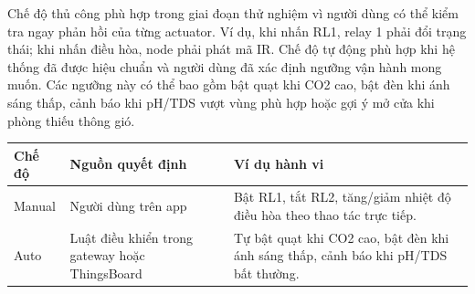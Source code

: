 Chế độ thủ công phù hợp trong giai đoạn thử nghiệm vì người dùng có thể kiểm tra ngay phản hồi của từng actuator. Ví dụ, khi nhấn RL1, relay 1 phải đổi trạng thái; khi nhấn điều hòa, node phải phát mã IR. Chế độ tự động phù hợp khi hệ thống đã được hiệu chuẩn và người dùng đã xác định ngưỡng vận hành mong muốn. Các ngưỡng này có thể bao gồm bật quạt khi CO2 cao, bật đèn khi ánh sáng thấp, cảnh báo khi pH/TDS vượt vùng phù hợp hoặc gợi ý mở cửa khi phòng thiếu thông gió.

\begin{longtable}{|p{3cm}|p{4.5cm}|p{5.7cm}|}
\hline
\textbf{Chế độ} & \textbf{Nguồn quyết định} & \textbf{Ví dụ hành vi} \\
\hline
Manual & Người dùng trên app & Bật RL1, tắt RL2, tăng/giảm nhiệt độ điều hòa theo thao tác trực tiếp. \\
\hline
Auto & Luật điều khiển trong gateway hoặc ThingsBoard & Tự bật quạt khi CO2 cao, bật đèn khi ánh sáng thấp, cảnh báo khi pH/TDS bất thường. \\
\hline
\end{longtable}
